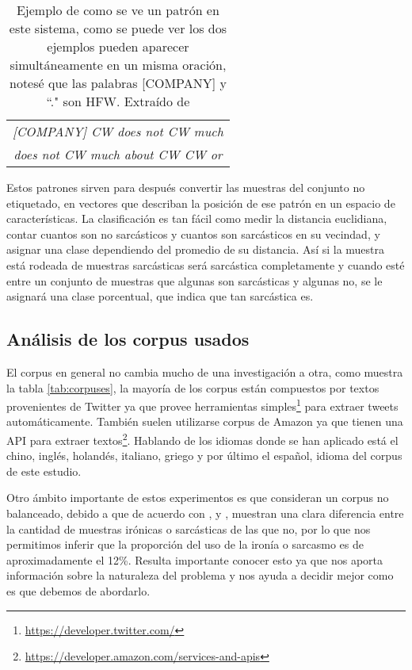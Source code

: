 		    \begin{table}[H]
		        \centering
		        \begin{tabular}{|c|}
		            \hline
		            \textit{[COMPANY] CW  does not CW much}\\
		            \textit{does not CW much about CW CW or}\\
		            \hline
		        \end{tabular}
		        \caption{\footnotesize{Ejemplo de como se ve un patrón en este sistema, como se puede ver los dos ejemplos pueden aparecer simultáneamente en un misma oración, notesé que las palabras [COMPANY] y ``." son \gls{HFW}. Extraído de \cite{davidov2010semi}}}
		        \label{tab:ejemplo}
		    \end{table}
		
		\par Estos patrones sirven para después convertir las muestras del conjunto no etiquetado, en vectores que describan la posición de ese patrón en un espacio de características. La clasificación es tan fácil como medir la distancia euclidiana, contar cuantos son no sarcásticos y cuantos son sarcásticos en su vecindad, y asignar una clase dependiendo del promedio de su distancia. Así si la muestra está rodeada de muestras sarcásticas será sarcástica completamente y cuando esté entre un conjunto de muestras que algunas son sarcásticas y algunas no, se le asignará una clase porcentual, que indica que tan sarcástica es.
		
		\subsection{Análisis de los corpus usados}
		
		\par El corpus en general no cambia mucho de una investigación a otra, como muestra la tabla \ref{tab:corpuses}, la mayoría de los corpus están compuestos por textos provenientes de Twitter ya que provee herramientas simples\footnote{\url{https://developer.twitter.com/}} para extraer tweets automáticamente. También suelen utilizarse corpus de Amazon ya que tienen una \gls{API} para extraer textos\footnote{ \url{https://developer.amazon.com/services-and-apis}}. Hablando de los idiomas donde se han aplicado está el chino, inglés, holandés, italiano, griego y por último el español, idioma del corpus de este estudio.
		
		\par Otro ámbito importante de estos experimentos es que consideran un corpus no balanceado, debido a que de acuerdo con \cite{reyes2012making}, \cite{lopez2016character} y \cite{barbieri2014italian}, muestran una clara diferencia entre la cantidad de muestras irónicas o sarcásticas de las que no, por lo que nos permitimos inferir que la proporción del uso de la ironía o sarcasmo es de aproximadamente el 12\%. Resulta importante conocer esto ya que nos aporta información sobre la naturaleza del problema y nos ayuda a decidir mejor como es que debemos de abordarlo.
		
